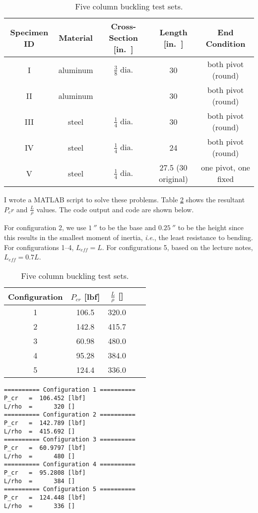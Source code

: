 \documentclass[12 pt]{article}
\newcommand{\ie}{\textit{i}.\textit{e}., }
\begin{document}
\begin{table}[!htbp]
\caption{Five column buckling test sets.}
\begin{center}
	\begin{tabular}{|c|c|c|c|c|}
		\hline
		Specimen ID&Material&Cross-Section [\unit{in.}]&Length [\unit{in.}]&End Condition\\
		\hline
		I&aluminum&$\frac{3}{8}$ dia.&\num{30}&both pivot (round)\\
		\hline
		II&aluminum&\numproduct{0.25x1}&\num{30}&both pivot (round)\\
		\hline
		III&steel&$\frac{1}{4}$ dia.&\num{30}&both pivot (round)\\
		\hline
		IV&steel&$\frac{1}{4}$ dia.&\num{24}&both pivot (round)\\
		\hline
		V&steel&$\frac{1}{4}$ dia.&\num{27.5} (\num{30} original)&one pivot, one fixed\\
		\hline
	\end{tabular}
\end{center}
\label{tbl:question_4_data}
\end{table}

I wrote a MATLAB script to solve these problems. Table \ref{tbl:data} shows the resultant $P_cr$ and $\frac{L}{\rho}$ values. The code output and code are shown below.

For configuration \num{2}, we use $\qty{1}{''}$ to be the base and $\qty{0.25}{''}$ to be the height since this results in the smallest moment of inertia, \ie the least resistance to bending. For configurations \numrange{1}{4}, $L_{eff}=L$. For configurations \num{5}, based on the lecture notes, $L_{eff}=0.7L$.

\begin{table}[!htbp]
\caption{Five column buckling test sets.}
\begin{center}
	\begin{tabular}{|c|c|c|c|c|}
		\hline
		Configuration&$P_{cr}$ [\unit{lbf}]&$\frac{L}{\rho}$ []\\
		\hline
		1&106.5&320.0\\
		\hline
		2&142.8&415.7\\
		\hline
		3&60.98&480.0\\
		\hline
		4&95.28&384.0\\
		\hline
		5&124.4&336.0\\
		\hline
	\end{tabular}
\end{center}
\label{tbl:data}
\end{table}

\begin{verbatim}
========== Configuration 1 ==========
P_cr   =  106.452 [lbf]
L/rho  =      320 []
========== Configuration 2 ==========
P_cr   =  142.789 [lbf]
L/rho  =  415.692 []
========== Configuration 3 ==========
P_cr   =  60.9797 [lbf]
L/rho  =      480 []
========== Configuration 4 ==========
P_cr   =  95.2808 [lbf]
L/rho  =      384 []
========== Configuration 5 ==========
P_cr   =  124.448 [lbf]
L/rho  =      336 []
\end{verbatim}
\end{document}
